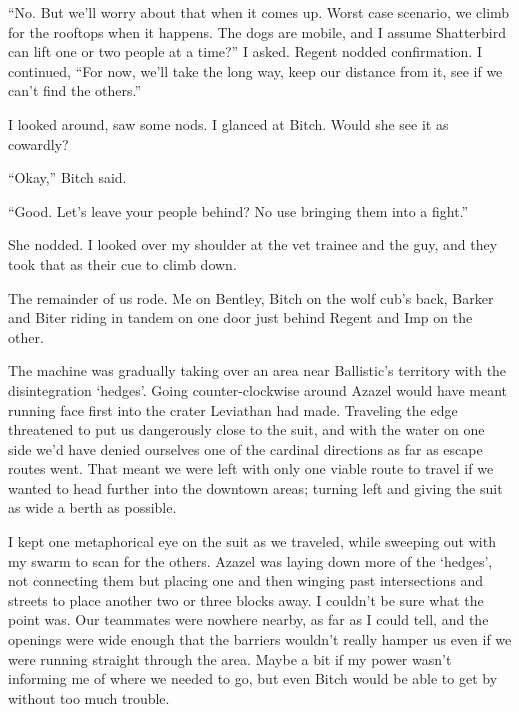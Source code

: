 ``No.  But we'll worry about that when it comes up.  Worst case scenario, we climb for the rooftops when it happens.  The dogs are mobile, and I assume Shatterbird can lift one or two people at a time?''  I asked.  Regent nodded confirmation.  I continued, ``For now, we'll take the long way, keep our distance from it, see if we can't find the others.''



I looked around, saw some nods.  I glanced at Bitch.  Would she see it as cowardly?



``Okay,'' Bitch said.



``Good.  Let's leave your people behind?  No use bringing them into a fight.''



She nodded.  I looked over my shoulder at the vet trainee and the guy, and they took that as their cue to climb down.



The remainder of us rode.  Me on Bentley, Bitch on the wolf cub's back, Barker and Biter riding in tandem on one door just behind Regent and Imp on the other.



The machine was gradually taking over an area near Ballistic's territory with the disintegration `hedges'.  Going counter-clockwise around Azazel would have meant running face first into the crater Leviathan had made.  Traveling the edge threatened to put us dangerously close to the suit, and with the water on one side we'd have denied ourselves one of the cardinal directions as far as escape routes went.  That meant we were left with only one viable route to travel if we wanted to head further into the downtown areas; turning left and giving the suit as wide a berth as possible.



I kept one metaphorical eye on the suit as we traveled, while sweeping out with my swarm to scan for the others.  Azazel was laying down more of the `hedges', not connecting them but placing one and then winging past intersections and streets to place another two or three blocks away.  I couldn't be sure what the point was.  Our teammates were nowhere nearby, as far as I could tell, and the openings were wide enough that the barriers wouldn't really hamper us even if we were running straight through the area.  Maybe a bit if my power wasn't informing me of where we needed to go, but even Bitch would be able to get by without too much trouble.



